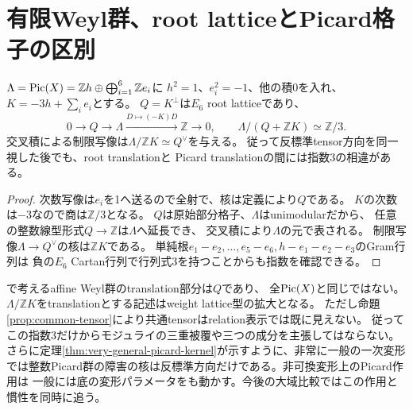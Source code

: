\section{有限Weyl群、root latticeとPicard格子の区別}
\begin{proposition}[反標準方向を除いたPicard格子]\label{prop:picard-root-index}
$\Lambda=\operatorname{Pic}(X)=\mathbb Zh\oplus\bigoplus_{i=1}^6\mathbb Ze_i$に
$h^2=1$、$e_i^2=-1$、他の積0を入れ、$K=-3h+\sum_i e_i$とする。
$Q=K^\perp$は$E_6$ root latticeであり、
\[
 0\longrightarrow Q\longrightarrow\Lambda
 \xrightarrow{D\mapsto(-K)D}\mathbb Z\longrightarrow0,
 \qquad \Lambda/(Q+\mathbb ZK)\simeq\mathbb Z/3.
\]
交叉積による制限写像は$\Lambda/\mathbb ZK\simeq Q^\vee$を与える。
従って反標準tensor方向を同一視した後でも、root translationと
Picard translationの間には指数3の相違がある。
\end{proposition}
\begin{proof}
次数写像は$e_i$を1へ送るので全射で、核は定義により$Q$である。
$K$の次数は$-3$なので商は$\mathbb Z/3$となる。
$Q$は原始部分格子、$\Lambda$はunimodularだから、
任意の整数線型形式$Q\to\mathbb Z$は$\Lambda$へ延長でき、
交叉積により$\Lambda$の元で表される。
制限写像$\Lambda\to Q^\vee$の核は$\mathbb ZK$である。
単純根$e_1-e_2,\ldots,e_5-e_6,h-e_1-e_2-e_3$のGram行列は
負の$E_6$ Cartan行列で行列式3を持つことからも指数を確認できる。
\end{proof}

\cite{OWR}で考えるaffine Weyl群のtranslation部分は$Q$であり、
全$\operatorname{Pic}(X)$と同じではない。
$\Lambda/\mathbb ZK$をtranslationとする記述はweight lattice型の拡大となる。
ただし命題\ref{prop:common-tensor}により共通tensorはrelation表示では既に見えない。
従ってこの指数3だけからモジュライの三重被覆や三つの成分を主張してはならない。
さらに定理\ref{thm:very-general-picard-kernel}が示すように、非常に一般の一次変形では整数Picard群の障害の核は反標準方向だけである。非可換変形上のPicard作用は
一般には底の変形パラメータをも動かす。今後の大域比較ではこの作用と慣性を同時に追う。
